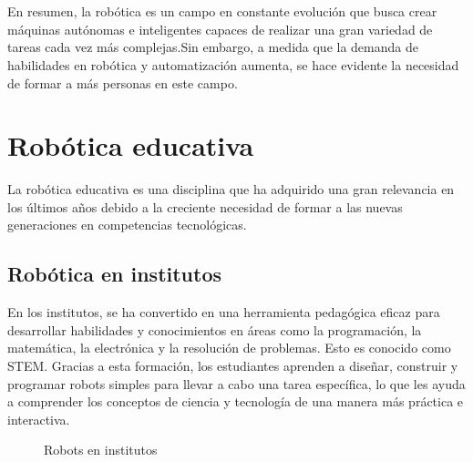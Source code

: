 \section*{}
En resumen, la robótica es un campo en constante evolución que busca crear máquinas autónomas e inteligentes capaces de realizar una gran variedad de tareas cada vez 
más complejas.Sin embargo, a medida que la demanda de habilidades en robótica y automatización aumenta, se hace evidente la necesidad de formar a más personas en este campo.

\newpage
\section{Robótica educativa}
La robótica educativa es una disciplina que ha adquirido una gran relevancia en los últimos años debido a la creciente necesidad de formar a las nuevas generaciones en
competencias tecnológicas.

\label{sec:rob_educativa}
\subsection{Robótica en institutos}
En los institutos, se ha convertido en una herramienta pedagógica eficaz para desarrollar habilidades y conocimientos en áreas como la programación, 
la matemática, la electrónica y la resolución de problemas. Esto es conocido como \ac{STEM}. Gracias a esta formación, los 
estudiantes aprenden a diseñar, construir y programar robots simples para llevar a cabo una tarea específica, lo que les ayuda a comprender  
los conceptos de ciencia y tecnología de una manera más práctica e interactiva.\\
\begin{figure} [ht!]
  \centering    
  \hspace{1cm}
  \caption{Robots en institutos}
\end{figure}

